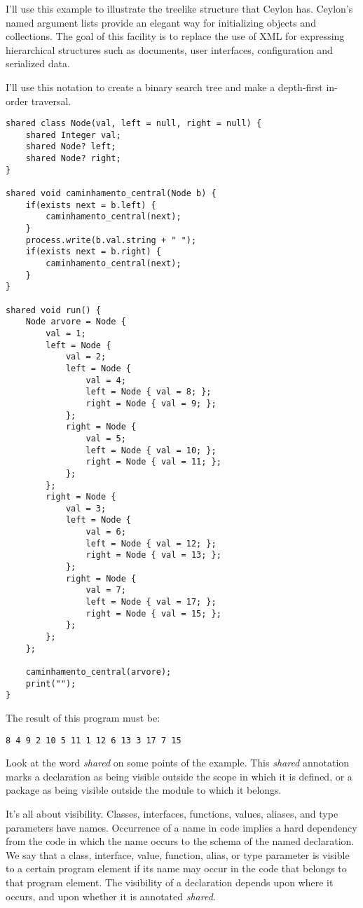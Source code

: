 I'll use this example to illustrate the treelike structure that Ceylon has.
Ceylon's named argument lists provide an elegant way for initializing objects
and collections. The goal of this facility is to replace the use of XML for
expressing hierarchical structures such as documents, user interfaces,
configuration and serialized data.

I'll use this notation to create a binary search tree and make a depth-first
in-order traversal.

\begin{lstlisting}[label=ctls,caption=Ceylon treelike structure]
shared class Node(val, left = null, right = null) {
	shared Integer val;
	shared Node? left;
	shared Node? right;
}

shared void caminhamento_central(Node b) {
	if(exists next = b.left) {
		caminhamento_central(next);
	}
	process.write(b.val.string + " ");
	if(exists next = b.right) {
		caminhamento_central(next);
	}
}

shared void run() {
	Node arvore = Node {
		val = 1;
		left = Node {
			val = 2;
			left = Node {
				val = 4;
				left = Node { val = 8; };
				right = Node { val = 9; };
			};
			right = Node {
				val = 5;
				left = Node { val = 10; };
				right = Node { val = 11; };
			};
		};
		right = Node {
			val = 3;
			left = Node {
				val = 6;
				left = Node { val = 12; };
				right = Node { val = 13; };
			};
			right = Node {
				val = 7;
				left = Node { val = 17; };
				right = Node { val = 15; };
			};
		};
	};

	caminhamento_central(arvore);
	print("");
}
\end{lstlisting}

The result of this program must be:

\begin{verbatim}
8 4 9 2 10 5 11 1 12 6 13 3 17 7 15
\end{verbatim}


Look at the word \textit{shared} on some points of the example. This \textit{shared}
annotation marks a declaration as being visible outside the scope in which it is
defined, or a package as being visible outside the module to which it
belongs\cite{1_6}.

It's all about visibility\cite{1_7}. Classes, interfaces, functions, values,
aliases, and type parameters have names. Occurrence of a name in code implies a
hard dependency from the code in which the name occurs to the schema of the
named declaration. We say that a class, interface, value, function, alias, or
type parameter is visible to a certain program element if its name may occur in
the  code that belongs to that program element. The visibility of a declaration
depends upon where it occurs, and upon whether it is annotated \textit{shared}. 

